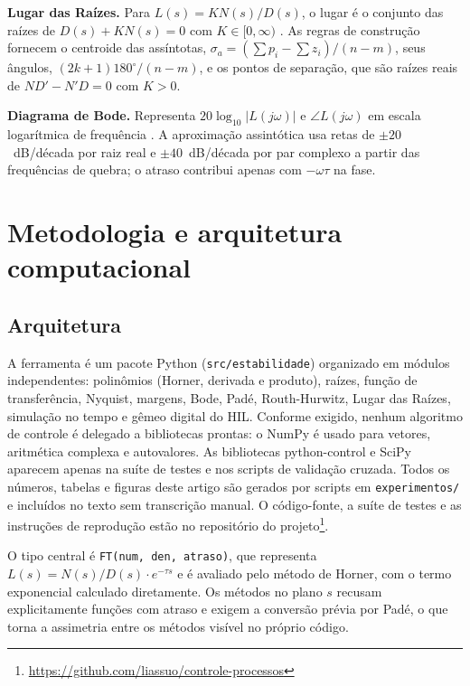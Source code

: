 \documentclass[12pt]{article}
\begin{document}
\textbf{Lugar das Raízes.} Para $L(s)=KN(s)/D(s)$, o lugar é o conjunto das raízes de $D(s)+KN(s)=0$ com $K\in[0,\infty)$ \cite{evans1948}. As regras de construção fornecem o centroide das assíntotas, $\sigma_a=(\sum p_i-\sum z_i)/(n-m)$, seus ângulos, $(2k+1)180^\circ/(n-m)$, e os pontos de separação, que são raízes reais de $N D' - N' D = 0$ com $K>0$.

\textbf{Diagrama de Bode.} Representa $20\log_{10}|L(j\omega)|$ e $\angle L(j\omega)$ em escala logarítmica de frequência \cite{bode1945}. A aproximação assintótica usa retas de $\pm 20$~dB/década por raiz real e $\pm 40$~dB/década por par complexo a partir das frequências de quebra; o atraso contribui apenas com $-\omega\tau$ na fase.

\section{Metodologia e arquitetura computacional}

\subsection{Arquitetura}

A ferramenta é um pacote Python (\texttt{src/estabilidade}) organizado em módulos independentes: polinômios (Horner, derivada e produto), raízes, função de transferência, Nyquist, margens, Bode, Padé, Routh-Hurwitz, Lugar das Raízes, simulação no tempo e gêmeo digital do HIL. Conforme exigido, nenhum algoritmo de controle é delegado a bibliotecas prontas: o NumPy \cite{harris2020} é usado para vetores, aritmética complexa e autovalores. As bibliotecas python-control \cite{fuller2021} e SciPy \cite{virtanen2020} aparecem apenas na suíte de testes e nos scripts de validação cruzada. Todos os números, tabelas e figuras deste artigo são gerados por scripts em \texttt{experimentos/} e incluídos no texto sem transcrição manual. O código-fonte, a suíte de testes e as instruções de reprodução estão no repositório do projeto\footnote{\url{https://github.com/liassuo/controle-processos}}.

O tipo central é \texttt{FT(num, den, atraso)}, que representa $L(s)=N(s)/D(s)\cdot e^{-\tau s}$ e é avaliado pelo método de Horner, com o termo exponencial calculado diretamente. Os métodos no plano $s$ recusam explicitamente funções com atraso e exigem a conversão prévia por Padé, o que torna a assimetria entre os métodos visível no próprio código.
\end{document}
